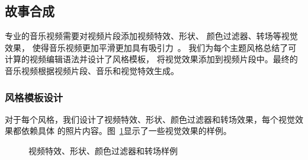 \documentclass[doctor]{ustcthesis}
\begin{document}
\subsection{故事合成}
专业的音乐视频需要对视频片段添加视频特效、形状、 颜色过滤器、转场等视觉效果，
使得音乐视频更加平滑更加具有吸引力~\cite{mei2007videosense}。
我们为每个主题风格总结了可计算的视频编辑语法并设计了风格模板，
将视觉效果添加到视频片段中。最终的音乐视频根据视频片段、音乐和视觉特效生成。

\subsubsection{风格模板设计}
对于每个风格，我们设计了视频特效、形状、颜色过滤器和转场效果，每个视觉效果都依赖具体
的照片内容。图~\ref{fig:monet-shape_et_example}显示了一些视觉效果的样例。
\begin{figure}[t]
    \centering
    \caption{视频特效、形状、颜色过滤器和转场样例}
    \label{fig:monet-shape_et_example}
    \vspace{-2em}
\end{figure}
\end{document}
